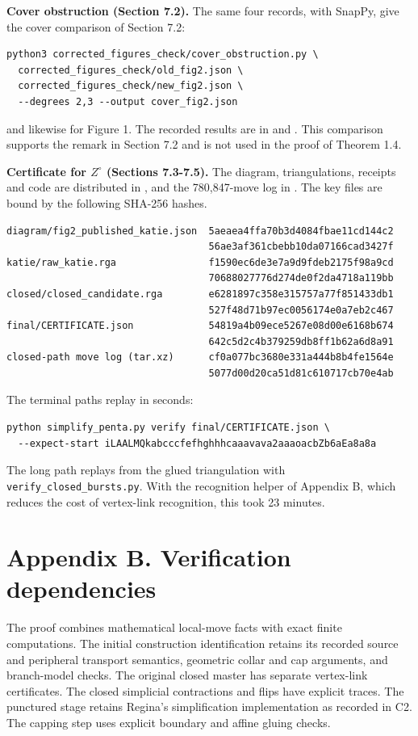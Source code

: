 \documentclass[11pt,letterpaper]{article}
\begin{document}
\smallskip\textbf{Cover obstruction (Section 7.2).} The same four records, with SnapPy, give the cover comparison of Section 7.2:
\begin{Verbatim}
python3 corrected_figures_check/cover_obstruction.py \
  corrected_figures_check/old_fig2.json \
  corrected_figures_check/new_fig2.json \
  --degrees 2,3 --output cover_fig2.json
\end{Verbatim}
and likewise for Figure 1. The recorded results are in  and . This comparison supports the remark in Section 7.2 and is not used in the proof of Theorem 1.4.

\smallskip\textbf{Certificate for $Z^\circ$ (Sections 7.3-7.5).} The diagram, triangulations, receipts and code are distributed in , and the 780,847-move log in . The key files are bound by the following SHA-256 hashes.
\begin{Verbatim}
diagram/fig2_published_katie.json  5aeaea4ffa70b3d4084fbae11cd144c2
                                   56ae3af361cbebb10da07166cad3427f
katie/raw_katie.rga                f1590ec6de3e7a9d9fdeb2175f98a9cd
                                   70688027776d274de0f2da4718a119bb
closed/closed_candidate.rga        e6281897c358e315757a77f851433db1
                                   527f48d71b97ec0056174e0a7eb2c467
final/CERTIFICATE.json             54819a4b09ece5267e08d00e6168b674
                                   642c5d2c4b379259db8ff1b62a6d8a91
closed-path move log (tar.xz)      cf0a077bc3680e331a444b8b4fe1564e
                                   5077d00d20ca51d81c610717cb70e4ab
\end{Verbatim}
The terminal paths replay in seconds:
\begin{Verbatim}
python simplify_penta.py verify final/CERTIFICATE.json \
  --expect-start iLAALMQkabcccfefhghhhcaaavava2aaaoacbZb6aEa8a8a
\end{Verbatim}
The long path replays from the glued triangulation with \texttt{verify\_closed\_bursts.py}. With the recognition helper of Appendix B, which reduces the cost of vertex-link recognition, this took 23 minutes.

\section*{Appendix B. Verification dependencies}
The proof combines mathematical local-move facts with exact finite computations. The initial construction identification retains its recorded source and peripheral transport semantics, geometric collar and cap arguments, and branch-model checks. The original closed master has separate vertex-link certificates. The closed simplicial contractions and flips have explicit traces. The punctured stage retains Regina's simplification implementation as recorded in C2. The capping step uses explicit boundary and affine gluing checks.
\end{document}
